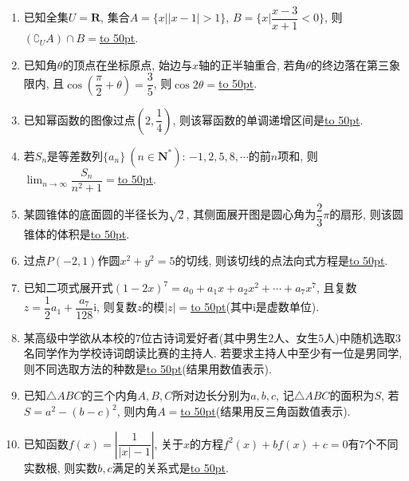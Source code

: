 \documentclass[10pt,a4paper]{article}
\newcommand{\blank}[1]{\underline{\hbox to #1pt{}}}
\begin{document}
\begin{enumerate}[1.]

\item 已知全集$U=\mathbf{R}$, 集合$A=\{x||x-1|>1\}$, $B=\{x|\dfrac{x-3}{x+1}<0\}$, 则$(\complement_U A)\cap B=$\blank{50}.  
\item 已知角$\theta$的顶点在坐标原点, 始边与$x$轴的正半轴重合, 若角$\theta$的终边落在第三象限内, 且$\cos(\dfrac\pi 2+\theta)=\dfrac35$, 则$\cos 2\theta=$\blank{50}.
\item 已知幂函数的图像过点$(2,\dfrac14)$, 则该幂函数的单调递增区间是\blank{50}.
\item 若$S_n$是等差数列$\{a_n\}\ (n\in \mathbf{N}^*)$: $-1,2,5,8,\cdots$的前$n$项和, 则$\displaystyle\lim_{n\to\infty}\dfrac{{S_n}}{{n^2}+1}=$\blank{50}.  
\item 某圆锥体的底面圆的半径长为$\sqrt2$, 其侧面展开图是圆心角为$\dfrac23\pi$的扇形, 则该圆锥体的体积是\blank{50}.
\item 过点$P(-2,1)$作圆$x^2+y^2=5$的切线, 则该切线的点法向式方程是\blank{50}.
\item 已知二项式展开式$(1-2x)^7=a_0+a_1x+a_2x^2+\cdots +a_7x^7$, 且复数$z=\dfrac12a_1+\dfrac{a_7}{128}\mathrm{i}$, 则复数$z$的模$|z|=$\blank{50}(其中$\mathrm{i}$是虚数单位).
\item 某高级中学欲从本校的$7$位古诗词爱好者(其中男生$2$人、女生$5$人)中随机选取$3$名同学作为学校诗词朗读比赛的主持人. 若要求主持人中至少有一位是男同学, 则不同选取方法的种数是\blank{50}(结果用数值表示).
\item 已知$\triangle ABC$的三个内角$A,B,C$所对边长分别为$a,b,c$, 记$\triangle ABC$的面积为$S$, 若$S=a^2-(b-c)^2$, 则内角$A=$\blank{50}(结果用反三角函数值表示).
\item 已知函数$f(x)=\left|\dfrac1{|x|-1}\right|$, 关于$x$的方程$f^2(x)+bf(x)+c=0$有$7$个不同实数根, 则实数$b,c$满足的关系式是\blank{50}.



\end{enumerate}
\end{document}
